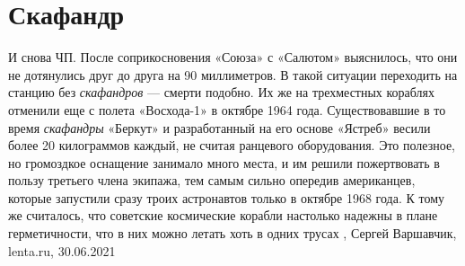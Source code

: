  
 
 
 
 
\chapter{Скафандр}

И снова ЧП. После соприкосновения «Союза» с «Салютом» выяснилось, что они не
дотянулись друг до друга на 90 миллиметров. В такой ситуации переходить на
станцию без \emph{скафандров} — смерти подобно. Их же на трехместных кораблях
отменили еще с полета «Восхода-1» в октябре 1964 года.  Существовавшие в то
время \emph{скафандры} «Беркут» и разработанный на его основе «Ястреб» весили
более 20 килограммов каждый, не считая ранцевого оборудования. Это полезное, но
громоздкое оснащение занимало много места, и им решили пожертвовать в пользу
третьего члена экипажа, тем самым сильно опередив американцев, которые
запустили сразу троих астронавтов только в октябре 1968 года. К тому же
считалось, что советские космические корабли настолько надежны в плане
герметичности, что в них можно летать хоть в одних трусах
, Сергей Варшавчик, lenta.ru, 30.06.2021

